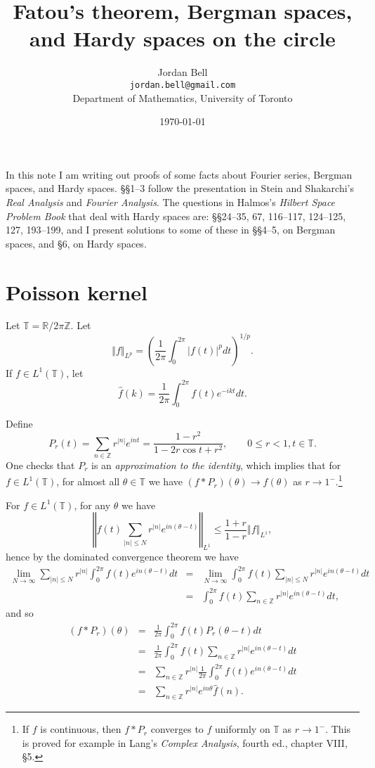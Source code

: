 \documentclass{article}
\newcommand{\norm}[1]{\left\Vert #1 \right\Vert}
\begin{document}
\title{Fatou's theorem, Bergman  spaces, and Hardy spaces on the  circle}
\author{Jordan Bell\\ \texttt{jordan.bell@gmail.com}\\Department of Mathematics, University of Toronto}
\date{\today}
\maketitle

In this note I am writing out proofs of some facts about Fourier series, Bergman spaces, and Hardy spaces. \S \S 1--3 follow the presentation in
Stein and Shakarchi's {\em Real Analysis}
and {\em Fourier Analysis}. The questions in Halmos's {\em Hilbert Space Problem Book} that deal with Hardy spaces are: \S \S 24--35,  67, 116--117,
124--125, 127, 193--199, and I present solutions to some of these in \S \S 4--5, on Bergman spaces, and \S 6, on Hardy spaces.


\section{Poisson kernel}
\label{poissonsection}
Let $\mathbb{T}=\mathbb{R} / 2\pi \mathbb{Z}$.  
Let 
\[
\norm{f}_{L^p} = \left( \frac{1}{2\pi} \int_0^{2\pi} |f(t)|^p dt \right)^{1/p}.
\]
If $f \in L^1(\mathbb{T})$, let
\[
\hat{f}(k)=\frac{1}{2\pi}\int_0^{2\pi} f(t) e^{-ikt}dt.
\] 



Define
\[
P_r(t)=\sum_{n \in \mathbb{Z}} r^{|n|} e^{int}=\frac{1-r^2}{1-2r\cos t + r^2}, \qquad 0 \leq r < 1, t \in \mathbb{T}.
\]
One checks that $P_r$ is an {\em approximation to the identity}, which implies that for $f \in L^1(\mathbb{T})$, for almost
all $\theta \in \mathbb{T}$ we have $(f * P_r)(\theta) \to f(\theta)$ as $r \to 1^-$.\footnote{If $f$ is continuous, then $f*P_r$ converges to $f$ uniformly on
$\mathbb{T}$ as $r \to 1^-$. This is proved for example in Lang's {\em Complex Analysis}, fourth ed., chapter VIII, \S 5.}

For $f \in L^1(\mathbb{T})$, for any $\theta$ we have
\[
\norm{f(t) \sum_{|n| \leq N} r^{|n|} e^{in(\theta-t)}}_{L^1} \leq \frac{1+r}{1-r} \norm{f}_{L^1},
\]
hence by the dominated convergence theorem we have
\begin{eqnarray*}
\lim_{N \to \infty} \sum_{|n| \leq N}  r^{|n|} \int_0^{2\pi} f(t)  e^{in(\theta-t)} dt 
&=&
\lim_{N \to \infty}  \int_0^{2\pi} f(t) \sum_{|n| \leq N} r^{|n|} e^{in(\theta-t)} dt\\
&=&\int_0^{2\pi} f(t) \sum_{n \in \mathbb{Z}} r^{|n|} e^{in(\theta-t)} dt,
\end{eqnarray*}
and so
\begin{eqnarray*}
(f*P_r)(\theta)&=&\frac{1}{2\pi}\int_0^{2\pi} f(t) P_r(\theta-t) dt\\
&=&\frac{1}{2\pi}\int_0^{2\pi} f(t)  \sum_{n \in \mathbb{Z}}  r^{|n|} e^{in(\theta-t)} dt\\
&=&\sum_{n \in \mathbb{Z}}  r^{|n|} \frac{1}{2\pi}\int_0^{2\pi} f(t)  e^{in(\theta-t)} dt\\
&=&\sum_{n \in \mathbb{Z}}  r^{|n|} e^{in\theta} \hat{f}(n).
\end{eqnarray*}
\end{document}
